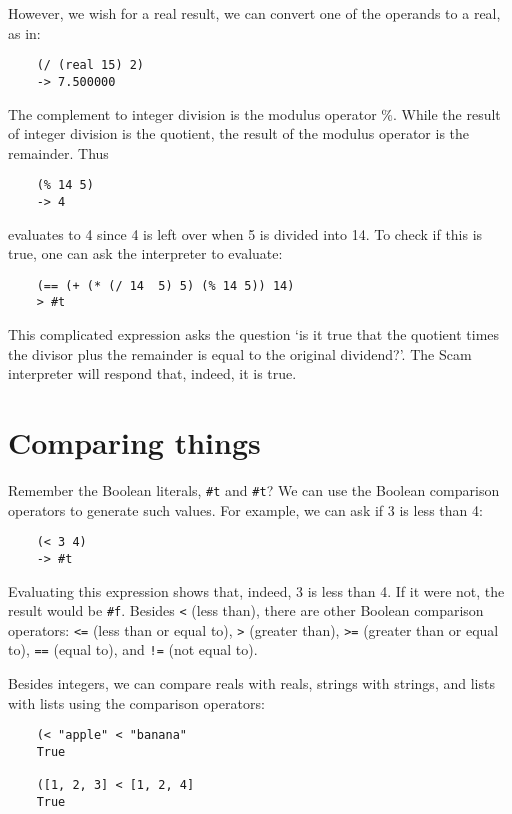 However, we wish for a real result, we can convert one of
the operands to a real, as in:

\begin{verbatim}
    (/ (real 15) 2)
    -> 7.500000
\end{verbatim}

The complement to integer division is the modulus operator \%. While the
result of integer division is the quotient, the result of the modulus
operator is the remainder. Thus

\begin{verbatim}
    (% 14 5)
    -> 4
\end{verbatim}

evaluates to 4 since 4 is left over when 5 is divided into 14. To check
if this is true, one can ask the interpreter to evaluate:

\begin{verbatim}
    (== (+ (* (/ 14  5) 5) (% 14 5)) 14)
    > #t
\end{verbatim}

This complicated expression asks the question `is it true that the
quotient times the divisor plus the remainder is equal to the original
dividend?'. The Scam interpreter will respond that, indeed, it is
true. 

\section{Comparing things}

Remember the {\sc Boolean} literals, {\tt #t} and {\tt #t}?
We can use the {\sc Boolean}
comparison operators to generate such values. For example, we can ask
if 3 is less than 4:

\begin{verbatim}
    (< 3 4)
    -> #t
\end{verbatim}

Evaluating this expression shows that, indeed, 3 is less than 4. If it were
not, the result would be {\tt #f}.
Besides
{\tt <}
(less than),
there are other {\sc Boolean} comparison operators:
{\tt <=}
(less than or equal to),
{\tt >}
(greater than),
{\tt >=}
(greater than or equal to),
{\tt ==}
(equal to), and
{\tt !=}
(not equal to).

Besides integers, we can compare reals with reals, strings with strings,
and lists with lists
using the comparison operators:

\begin{verbatim}
    (< "apple" < "banana"
    True
    
    ([1, 2, 3] < [1, 2, 4]
    True
\end{verbatim}
    
